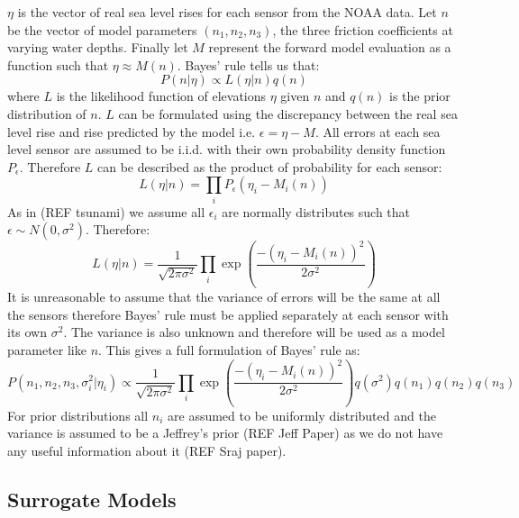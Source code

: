 \documentclass[12pt,a4paper]{article}
\begin{document}
$\eta$ is the vector of real sea level rises for each sensor from the NOAA data. Let $n$ be the vector of model parameters $(n_1,n_2,n_3)$, the three friction coefficients at varying water depths. Finally let $M$ represent the forward model evaluation as a function such that $\eta \approx M(n)$. Bayes' rule tells us that:
\begin{equation}
	P(n|\eta) \propto L(\eta|n)q(n)
\end{equation}
where $L$ is the likelihood function of elevations $\eta$ given $n$ and $q(n)$ is the prior distribution of $n$. $L$ can be formulated using the discrepancy between the real sea level rise and rise predicted by the model i.e. $\epsilon=\eta-M$. All errors at each sea level sensor are assumed to be i.i.d. with their own probability density function $P_\epsilon$. Therefore $L$ can be described as the product of probability for each sensor:
\begin{equation}
	L(\eta|n)=\prod_i P_\epsilon(\eta_i - M_i(n))
\end{equation}
As in (REF tsunami) we assume all $\epsilon_i$ are normally distributes such that $\epsilon\sim N(0,\sigma^2)$. Therefore:
\begin{equation}
	L(\eta|n) = \frac{1}{\sqrt{2\pi\sigma^2}}\prod_i \exp \left(   \frac{-(\eta_i-M_i(n))^2}{2\sigma^2}  \right)
\end{equation}
It is unreasonable to assume that the variance of errors will be the same at all the sensors therefore Bayes' rule must be applied separately at each sensor with its own $\sigma^2$. The variance is also unknown and therefore will be used as a model parameter like $n$. This gives a full formulation of Bayes' rule as:
\begin{equation}
	P(n_1,n_2,n_3,\sigma^2_i|\eta_i)\propto \frac{1}{\sqrt{2\pi\sigma^2}}\prod_i\exp\left(
	\frac{-(\eta_i - M_i(n))^2}{2\sigma^2}
	\right)q(\sigma^2)q(n_1)q(n_2)q(n_3)
\end{equation}
For prior distributions all $n_i$ are assumed to be uniformly distributed and the variance is assumed to be a Jeffrey's prior (REF Jeff Paper) as we do not have any useful information about it (REF Sraj paper).
\subsection{Surrogate Models}
\end{document}
